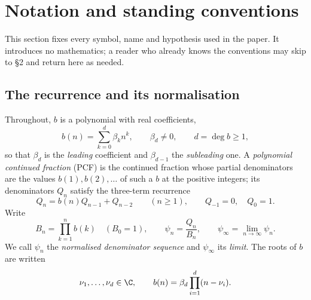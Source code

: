 %

\section{Notation and standing conventions}\label{sec:notation}

This section fixes every symbol, name and hypothesis used in the paper. It
introduces no mathematics; a reader who already knows the conventions may skip
to \S2 and return here as needed.

\subsection{The recurrence and its normalisation}\label{ssec:recurrence}

Throughout, $b$ is a polynomial with real coefficients,
\[
  b(n)=\sum_{k=0}^{d}\beta_k n^k ,\qquad \beta_d\neq0,\qquad d=\deg b\ge1 ,
\]
so that $\beta_d$ is the \emph{leading} coefficient and $\beta_{d-1}$ the
\emph{subleading} one. A \emph{polynomial continued fraction} (PCF) is the
continued fraction whose partial denominators are the values $b(1),b(2),\dots$
of such a $b$ at the positive integers; its denominators $Q_n$ satisfy the
three-term recurrence
\begin{equation}\label{eq:n-rec}
  Q_n=b(n)Q_{n-1}+Q_{n-2}\qquad(n\ge1),\qquad Q_{-1}=0,\quad Q_0=1 .
\end{equation}
Write
\begin{equation}\label{eq:n-norm}
  B_n=\prod_{k=1}^{n}b(k)\quad(B_0=1),\qquad
  \psi_n=\frac{Q_n}{B_n},\qquad
  \psi_\infty=\lim_{n\to\infty}\psi_n .
\end{equation}
We call $\psi_n$ the \emph{normalised denominator sequence} and $\psi_\infty$ its
\emph{limit}. The roots of $b$ are written
\begin{equation}\label{eq:n-roots}
  \nu_1,\dots,\nu_d\in\C,\qquad b(n)=\beta_d\prod_{i=1}^{d}(n-\nu_i).
\end{equation}

